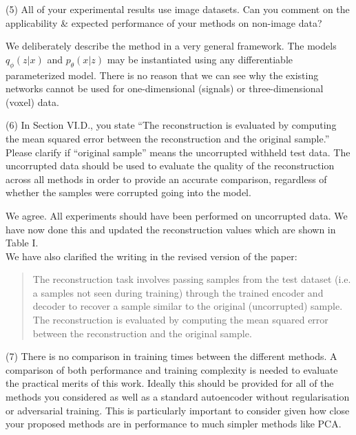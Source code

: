 \documentclass[a4paper,11pt]{article}
\begin{document}
{\color{blue}
(5) All of your experimental results use image datasets. Can you comment on the applicability \& expected performance of your methods on non-image data?}\newline

We deliberately describe the method in a very general framework. 
The models $q_\phi(z|x)$ and $p_\theta(x|z)$ may be instantiated using 
any differentiable parameterized model.  There is no reason that we can see why the
existing networks cannot be used for one-dimensional (signals) or three-dimensional (voxel) data.\newline

{\color{blue}
(6) In Section VI.D., you state ``The reconstruction is evaluated by computing the mean squared error between the reconstruction and the original sample.'' Please clarify if ``original sample'' means the uncorrupted withheld test data. The uncorrupted data should be used to evaluate the quality of the reconstruction across all methods in order to provide an accurate comparison, regardless of whether the samples were corrupted going into the model.}\newline


We agree. All experiments should have been performed on uncorrupted data. We have now done this and updated the reconstruction values which are shown in Table I.\\
 
We have also clarified the writing in the revised version of the paper:
\begin{quote}
{\color{red} The reconstruction task involves passing samples from the test dataset (i.e. a samples not seen during training) through the trained encoder and decoder to recover a sample similar to the original (uncorrupted) sample. The reconstruction is evaluated by computing the mean squared error between the reconstruction and the original sample.}
\end{quote}


{\color{blue}
(7) There is no comparison in training times between the different methods. A comparison of both performance and training complexity is needed to evaluate the practical merits of this work. Ideally this should be provided for all of the methods you considered as well as a standard autoencoder without regularisation or adversarial training. This is particularly important to consider given how close your proposed methods are in performance to much simpler methods like PCA.}\newline
\end{document}
